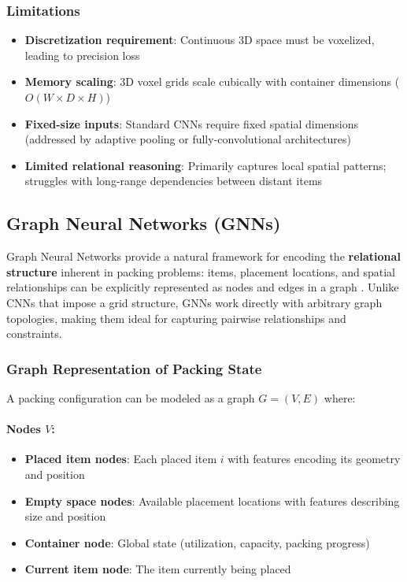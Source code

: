\subsubsection{Limitations}

\begin{itemize}
\item \textbf{Discretization requirement}: Continuous 3D space must be voxelized, leading to precision loss
\item \textbf{Memory scaling}: 3D voxel grids scale cubically with container dimensions ($O(W \times D \times H)$)
\item \textbf{Fixed-size inputs}: Standard CNNs require fixed spatial dimensions (addressed by adaptive pooling or fully-convolutional architectures)
\item \textbf{Limited relational reasoning}: Primarily captures local spatial patterns; struggles with long-range dependencies between distant items
\end{itemize}


\subsection{Graph Neural Networks (GNNs)}

Graph Neural Networks provide a natural framework for encoding the \textbf{relational structure} inherent in packing problems: items, placement locations, and spatial relationships can be explicitly represented as nodes and edges in a graph \cite{SZL+22, ZWL+24}. Unlike CNNs that impose a grid structure, GNNs work directly with arbitrary graph topologies, making them ideal for capturing pairwise relationships and constraints.

\subsubsection{Graph Representation of Packing State}

A packing configuration can be modeled as a graph $G = (V, E)$ where:

\paragraph{Nodes $V$:}
\begin{itemize}
\item \textbf{Placed item nodes}: Each placed item $i$ with features encoding its geometry and position
\item \textbf{Empty space nodes}: Available placement locations with features describing size and position
\item \textbf{Container node}: Global state (utilization, capacity, packing progress)
\item \textbf{Current item node}: The item currently being placed
\end{itemize}

